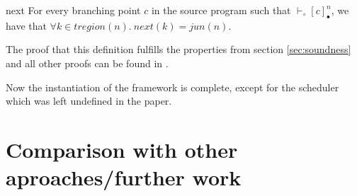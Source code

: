 \documentclass[a4paper,10pt]{llncs}
\begin{document}
\begin{definition}{next}
For every branching point $c$ in the source program such that $\vdash_\circ [c]_\bullet^n$, we  have
that $\forall k \in tregion(n) .\ next(k) = jun(n)$.
\end{definition}

The proof that this definition fulfills the properties from section \ref{sec:soundness} and all other
proofs can be found in \cite{Barthe09}.

Now the instantiation of the framework is complete, except for the scheduler which was left undefined
in the paper.

\section{Comparison with other aproaches/further work}
\label{sec:furtherwork}


\end{document}
